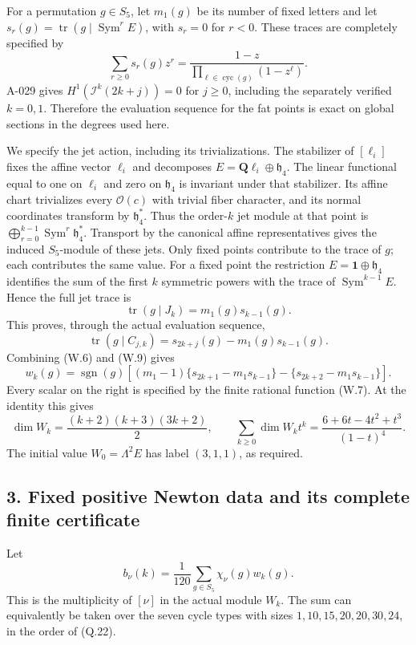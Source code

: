 \documentclass[
  10pt,
]{article}
\begin{document}
For a permutation \(g\in S_5\), let \(m_1(g)\) be its number of fixed
letters and let
\(s_r(g)=\operatorname{tr}(g\mid\operatorname{Sym}^rE)\), with \(s_r=0\)
for \(r<0\). These traces are completely specified by \[
\sum_{r\ge0}s_r(g)z^r
=\frac{1-z}{\prod_{\ell\in\operatorname{cyc}(g)}(1-z^\ell)}.
\tag{W.7}
\] A-029 gives \(H^1(\mathcal I^k(2k+j))=0\) for \(j\ge0\), including
the separately verified \(k=0,1\). Therefore the evaluation sequence for
the fat points is exact on global sections in the degrees used here.

We specify the jet action, including its trivializations. The stabilizer
of \([\ell_i]\) fixes the affine vector \(\ell_i\) and decomposes
\(E=\mathbf Q\ell_i\oplus\mathfrak h_4\). The linear functional equal to
one on \(\ell_i\) and zero on \(\mathfrak h_4\) is invariant under that
stabilizer. Its affine chart trivializes every \(\mathcal O(c)\) with
trivial fiber character, and its normal coordinates transform by
\(\mathfrak h_4^*\). Thus the order-\(k\) jet module at that point is
\(\bigoplus_{r=0}^{k-1}\operatorname{Sym}^r\mathfrak h_4^*\). Transport
by the canonical affine representatives gives the induced \(S_5\)-module
of these jets. Only fixed points contribute to the trace of \(g\); each
contributes the same value. For a fixed point the restriction
\(E=\mathbf1\oplus\mathfrak h_4\) identifies the sum of the first \(k\)
symmetric powers with the trace of \(\operatorname{Sym}^{k-1}E\). Hence
the full jet trace is \[
\operatorname{tr}(g\mid J_k)=m_1(g)s_{k-1}(g).
\tag{W.8}
\] This proves, through the actual evaluation sequence, \[
\operatorname{tr}(g\mid C_{j,k})=s_{2k+j}(g)-m_1(g)s_{k-1}(g).
\tag{W.9}
\] Combining (W.6) and (W.9) gives \[
w_k(g)=\operatorname{sgn}(g)\left[
(m_1-1)\{s_{2k+1}-m_1s_{k-1}\}
-\{s_{2k+2}-m_1s_{k-1}\}\right].
\tag{W.10}
\] Every scalar on the right is specified by the finite rational
function (W.7). At the identity this gives \[
\dim W_k=\frac{(k+2)(k+3)(3k+2)}2,
\qquad
\sum_{k\ge0}\dim W_k t^k
=\frac{6+6t-4t^2+t^3}{(1-t)^4}.
\tag{W.11}
\] The initial value \(W_0=\Lambda^2E\) has label \((3,1,1)\), as
required.

\subsection{3. Fixed positive Newton data and its complete finite
certificate}\label{fixed-positive-newton-data-and-its-complete-finite-certificate}

Let \[
b_\nu(k)=\frac1{120}\sum_{g\in S_5}\chi_\nu(g)w_k(g).
\tag{W.12}
\] This is the multiplicity of \([\nu]\) in the actual module \(W_k\).
The sum can equivalently be taken over the seven cycle types with sizes
\(1,10,15,20,20,30,24\), in the order of (Q.22).
\end{document}
